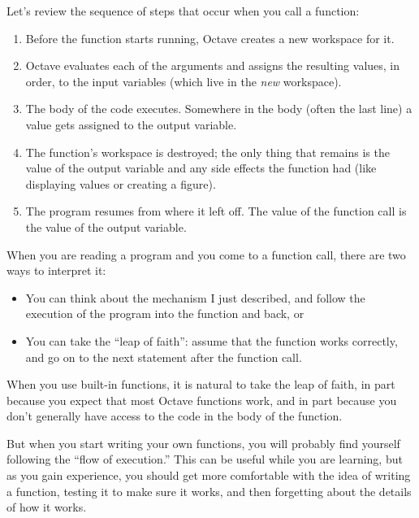 Let's review the sequence of steps that occur when you call
a function:

\begin{enumerate}

\item Before the function starts running, Octave creates a new
workspace for it.

\item Octave evaluates each of the arguments and assigns
the resulting values, in order, to the input variables (which
live in the {\em new} workspace).

\item The body of the code executes. Somewhere in the body
(often the last line) a value gets assigned to the output variable.

\item The function's workspace is destroyed; the only thing
that remains is the value of the output variable and any side
effects the function had (like displaying values or creating
a figure).

\item The program resumes from where it left off. The value
of the function call is the value of the output variable.

\end{enumerate}

When you are reading a program and you come to a function call,
there are two ways to interpret it:

\begin{itemize}

\item You can think about the mechanism I just described,
and follow the execution of the program into the function and back, or

\item You can take the ``leap of faith'': assume that the function
works correctly, and go on to the next statement after the
function call.

\end{itemize}

When you use built-in functions, it is natural to take the leap
of faith, in part because you expect that most
Octave functions work, and in part because you don't
generally have access to the code in the body of the function.

But when you start writing your own functions, you will probably
find yourself following the ``flow of execution.'' This can
be useful while you are learning, but as you gain experience, you
should get more comfortable with the idea of writing a function,
testing it to make sure it works, and then forgetting about the
details of how it works.

